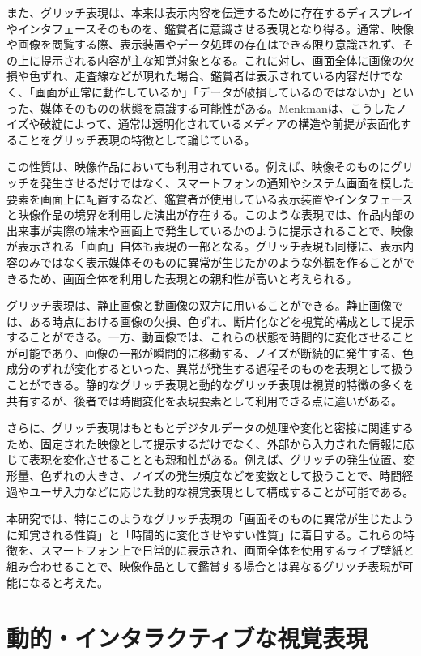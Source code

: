 また、グリッチ表現は、本来は表示内容を伝達するために存在するディスプレイやインタフェースそのものを、鑑賞者に意識させる表現となり得る。通常、映像や画像を閲覧する際、表示装置やデータ処理の存在はできる限り意識されず、その上に提示される内容が主な知覚対象となる。これに対し、画面全体に画像の欠損や色ずれ、走査線などが現れた場合、鑑賞者は表示されている内容だけでなく、「画面が正常に動作しているか」「データが破損しているのではないか」といった、媒体そのものの状態を意識する可能性がある。Menkmanは、こうしたノイズや破綻によって、通常は透明化されているメディアの構造や前提が表面化することをグリッチ表現の特徴として論じている\cite{menkman2011momentum}。

この性質は、映像作品においても利用されている。例えば、映像そのものにグリッチを発生させるだけではなく、スマートフォンの通知やシステム画面を模した要素を画面上に配置するなど、鑑賞者が使用している表示装置やインタフェースと映像作品の境界を利用した演出が存在する。このような表現では、作品内部の出来事が実際の端末や画面上で発生しているかのように提示されることで、映像が表示される「画面」自体も表現の一部となる。グリッチ表現も同様に、表示内容のみではなく表示媒体そのものに異常が生じたかのような外観を作ることができるため、画面全体を利用した表現との親和性が高いと考えられる。

グリッチ表現は、静止画像と動画像の双方に用いることができる。静止画像では、ある時点における画像の欠損、色ずれ、断片化などを視覚的構成として提示することができる。一方、動画像では、これらの状態を時間的に変化させることが可能であり、画像の一部が瞬間的に移動する、ノイズが断続的に発生する、色成分のずれが変化するといった、異常が発生する過程そのものを表現として扱うことができる。静的なグリッチ表現と動的なグリッチ表現は視覚的特徴の多くを共有するが、後者では時間変化を表現要素として利用できる点に違いがある。

さらに、グリッチ表現はもともとデジタルデータの処理や変化と密接に関連するため、固定された映像として提示するだけでなく、外部から入力された情報に応じて表現を変化させることとも親和性がある。例えば、グリッチの発生位置、変形量、色ずれの大きさ、ノイズの発生頻度などを変数として扱うことで、時間経過やユーザ入力などに応じた動的な視覚表現として構成することが可能である。

本研究では、特にこのようなグリッチ表現の「画面そのものに異常が生じたように知覚される性質」と「時間的に変化させやすい性質」に着目する。これらの特徴を、スマートフォン上で日常的に表示され、画面全体を使用するライブ壁紙と組み合わせることで、映像作品として鑑賞する場合とは異なるグリッチ表現が可能になると考えた。


\section{動的・インタラクティブな視覚表現}

